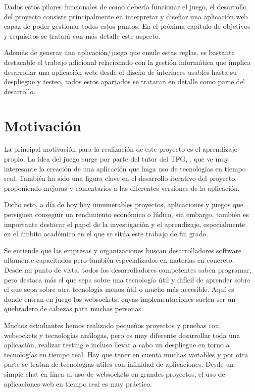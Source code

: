 Dados estos pilares funcionales de como debería funcionar el juego, el desarrollo del proyecto consiste principalmente en
interpretar y diseñar una aplicación web capaz de poder gestionar todos estos puntos. En el próxima capítulo de objetivos y requisitos se tratará
con más detalle este aspecto.

Además de generar una aplicación/juego que emule estas reglas, es bastante destacable el trabajo adicional relacionado con la gestión informática que
implica desarrollar una aplicación web: desde el diseño de interfaces usables hasta su despliegue y testeo, todos estos apartados se trataran en detalle
como parte del desarrollo.

\section{Motivación}

La principal motivación para la realización de este proyecto es el aprendizaje propio. La idea del juego
surge por parte del tutor del TFG, \nombretutor, que ve muy interesante la creación de una aplicación que haga uso de tecnologías en
tiempo real. También ha sido una figura clave en el desarrollo iterativo del proyecto, proponiendo mejoras y comentarios
a las diferentes versiones de la aplicación.

Dicho esto, a día de hoy hay innumerables proyectos, aplicaciones y juegos que persiguen conseguir un rendimiento económico o lúdico, sin embargo, también es importante destacar el papel
de la investigación y el aprendizaje, especialmente en el ámbito académico en el que se sitúa este trabajo de fin grado.

Se entiende que las empresas y organizaciones buscan desarrolladores software altamente capacitados pero también especializados en materias en concreto. Desde mi punto de vista,
todos los desarrolladores competentes saben programar, pero destaca más el que sepa sobre una tecnología útil y difícil de aprender sobre el que sepa
sobre otra tecnología menos útil o mucho más accesible. Aquí es donde entran en juego los websockets, cuyas implementaciones suelen ser un quebradero
de cabezas para muchas personas.

Muchos estudiantes hemos realizado pequeños proyectos y pruebas con websockets y tecnologías análogas, pero es muy diferente desarrollar toda una aplicación, realizar testing e
incluso llevar a cabo un despliegue en torno a tecnologías en tiempo real. Hay que tener en cuenta muchas variables y por otra parte se tratan de tecnologías utiles
con infinidad de aplicaciones. Desde un simple chat en línea al uso de websockets en grandes proyectos, el uso de aplicaciones web en tiempo real es muy práctico.

